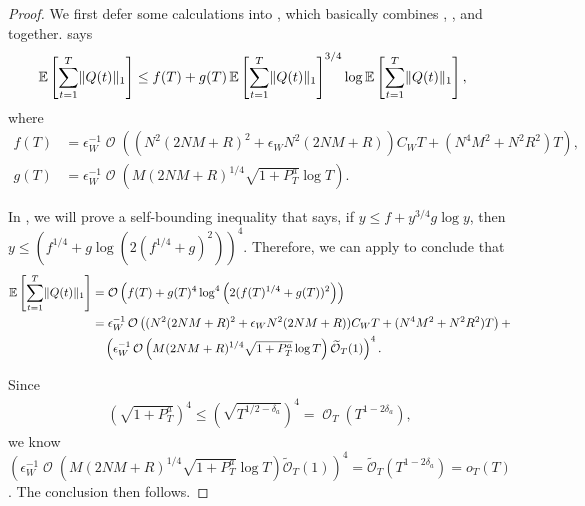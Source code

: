 \documentclass[11pt,fullpage,letterpaper]{article} %
\renewcommand{\bm}[1]{#1}%
\renewcommand{\tilde}{\widetilde}
\renewcommand{\O}{\operatorname{\mathcal O}}
\newcommand{\Otil}{\operatorname{\tilde{\mathcal O}}}
\newcommand{\E}{\operatornamewithlimits{\mathbb{E}}}
\begin{document}
\begin{proof}
We first defer some calculations into , which basically combines , , and  together.  says
\begin{align*}
\E\left [\sum_{t=1}^T \lVert \bm Q(t)\rVert_1\right ]&\le f(T) + g(T) \E\left [\sum_{t=1}^T \lVert \bm Q(t)\rVert_1\right ]^{3/4} \log \E \left [ \sum_{t=1}^T \lVert \bm Q(t)\rVert_1\right ],
\end{align*}
where
\begin{align*}
f(T)&=\epsilon_W^{-1}\O\left ((N^2(2NM+R)^2 + \epsilon_W N^2 (2NM+R))C_W T + (N^4 M^2 + N^2 R^2)T\right ),\\
g(T)&=\epsilon_W^{-1} \O\left (M (2NM+R)^{1/4} \sqrt{1+P_T^a} \log T\right ).
\end{align*}

In , we will prove a self-bounding inequality that says, if $y\le f + y^{3/4} g \log y$, then $y\le \left (f^{1/4} + g \log \left (2(f^{1/4} + g)^2\right )\right )^4$. Therefore, we can apply  to conclude that
\begin{align*}
\E\left [\sum_{t=1}^T \lVert \bm Q(t)\rVert_1\right ]
&= \O\left (f(T) + g(T)^4  \log^4 \left (2(f(T)^{1/4} + g(T))^2\right )\right )\\
&=\epsilon_W^{-1}\O\left ((N^2(2NM+R)^2 + \epsilon_W N^2 (2NM+R))C_W T + (N^4 M^2 + N^2 R^2)T\right ) + \\
&\quad \left (\epsilon_W^{-1} \O\left (M (2NM+R)^{1/4} \sqrt{1+P_T^a} \log T\right ) \Otil_T(1)\right )^4.
\end{align*}

Since
\begin{align*}
\left (\sqrt{1+P_T^a}\right )^4\le \left (\sqrt{T^{1/2 - \delta_a}}\right )^4 = \O_T (T^{1-2\delta_a}),
\end{align*}
we know $\left (\epsilon_W^{-1} \O\left (M (2NM+R)^{1/4} \sqrt{1+P_T^a} \log T\right ) \Otil_T(1)\right )^4=\Otil_T(T^{1-2\delta_a})=o_T(T)$.
The conclusion then follows.
\end{proof}
\end{document}
